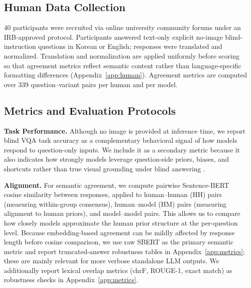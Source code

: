 \documentclass[letterpaper]{article}
\begin{document}
\subsection{Human Data Collection}
\label{sec:human_data}

40 participants were recruited via online university community forums under
an IRB-approved protocol. Participants answered text-only
explicit no-image blind-instruction questions in Korean or English; responses were translated and
normalized. Translation and normalization are applied uniformly before
scoring so that agreement metrics reflect semantic content rather than
language-specific formatting differences (Appendix~\ref{app:human}).
Agreement metrics are computed over 339 question--variant pairs
per human and per model.
\subsection{Metrics and Evaluation Protocols}
\label{sec:eval_protocols}

\textbf{Task Performance.} Although no image is provided at inference time,
we report blind VQA task accuracy as a complementary behavioral signal of how
models respond to question-only inputs. We include it as a secondary metric
because it also indicates how strongly models leverage question-side priors,
biases, and shortcuts rather than true visual grounding under blind answering
\citep{chen2024are,lee2024vlind}.

\textbf{Alignment.} For semantic agreement, we compute pairwise
Sentence-BERT cosine similarity \citep{wang2020minilm} between responses,
applied to human--human (HH) pairs (measuring within-group consensus),
human--model (HM) pairs (measuring alignment to human priors), and
model--model pairs. This allows us to compare how closely models approximate
the human prior structure at the per-question level. Because embedding-based
agreement can be mildly affected by response length before cosine comparison,
we use raw SBERT as the primary semantic metric and report truncated-answer
robustness tables in Appendix~\ref{app:metrics}; these are mainly relevant
for more verbose standalone LLM outputs. We additionally report lexical
overlap metrics (chrF, ROUGE-1, exact match) as robustness checks in
Appendix~\ref{app:metrics}.
\end{document}
